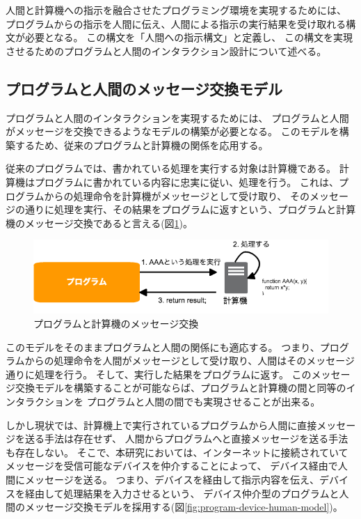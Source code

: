 人間と計算機への指示を融合させたプログラミング環境を実現するためには、
プログラムからの指示を人間に伝え、人間による指示の実行結果を受け取れる構文が必要となる。
この構文を「人間への指示構文」と定義し、
この構文を実現させるためのプログラムと人間のインタラクション設計について述べる。

\subsection{プログラムと人間のメッセージ交換モデル}\label{ux30d7ux30edux30b0ux30e9ux30e0ux3068ux4ebaux9593ux306eux30e1ux30c3ux30bbux30fcux30b8ux4ea4ux63dbux30e2ux30c7ux30eb}

プログラムと人間のインタラクションを実現するためには、
プログラムと人間がメッセージを交換できるようなモデルの構築が必要となる。
このモデルを構築するため、従来のプログラムと計算機の関係を応用する。

従来のプログラムでは、書かれている処理を実行する対象は計算機である。
計算機はプログラムに書かれている内容に忠実に従い、処理を行う。
これは、プログラムからの処理命令を計算機がメッセージとして受け取り、
そのメッセージの通りに処理を実行、その結果をプログラムに返すという、プログラムと計算機のメッセージ交換であると言える(図\ref{fig:program-machine-model})。

\begin{figure}[htbp]
  \begin{center}
  \includegraphics[width=.7\linewidth,bb=0 0 659 165]{images/program-machine-model.png}
  \end{center}
  \caption{プログラムと計算機のメッセージ交換}
  \label{fig:program-machine-model}
\end{figure}

このモデルをそのままプログラムと人間の関係にも適応する。
つまり、プログラムからの処理命令を人間がメッセージとして受け取り、人間はそのメッセージ通りに処理を行う。
そして、実行した結果をプログラムに返す。
このメッセージ交換モデルを構築することが可能ならば、プログラムと計算機の間と同等のインタラクションを
プログラムと人間の間でも実現させることが出来る。

しかし現状では、計算機上で実行されているプログラムから人間に直接メッセージを送る手法は存在せず、
人間からプログラムへと直接メッセージを送る手法も存在しない。
そこで、本研究においては、インターネットに接続されていてメッセージを受信可能なデバイスを仲介することによって、
デバイス経由で人間にメッセージを送る。
つまり、デバイスを経由して指示内容を伝え、デバイスを経由して処理結果を入力させるという、
デバイス仲介型のプログラムと人間のメッセージ交換モデルを採用する(図\ref{fig:program-device-human-model})。

